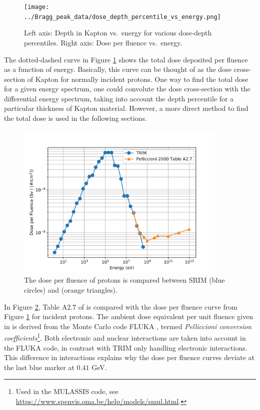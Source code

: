\documentclass{hitec}
\begin{document}
\begin{figure}[htbp!]
	\centering
	\texttt{[image: ../Bragg\_peak\_data/dose\_depth\_percentile\_vs\_energy.png]}
	\caption{Left axis: Depth in Kapton vs.\ energy for various dose-depth percentiles. Right axis: Dose per fluence vs.\ energy.}\label{fig:dose_depth_percentile_vs_energy}
\end{figure}


The dotted-dashed curve in Figure \ref{fig:dose_depth_percentile_vs_energy} shows the total dose deposited per fluence as a function of energy. Basically, this curve can be thought of as the dose cross-section of Kapton for normally incident protons. One way to find the total dose for a given energy spectrum, one could convolute the dose cross-section with the differential energy spectrum, taking into account the depth percentile for a particular thickness of Kapton material. However, a more direct method to find the total dose is used in the following sections.

\begin{figure}[h!]
	\centering
	\includegraphics[width=0.9\textwidth]{../Bragg_peak_data/comparison_dose_vs_energy.png}
	\caption{The dose per fluence of protons is compared between SRIM (blue circles) and \cite{pelliccioni2000overview} (orange triangles).}\label{fig:comparison_dose_vs_energy}
\end{figure}

In Figure \ref{fig:comparison_dose_vs_energy}, Table A2.7 of \cite{pelliccioni2000overview} is compared with the dose per fluence curve from Figure \ref{fig:dose_depth_percentile_vs_energy} for incident protons. The ambient dose equivalent per unit fluence given in \cite{pelliccioni2000overview} is derived from the Monte Carlo code FLUKA \citep{battistoni2015overview}, termed \textit{Pelliccioni conversion coefficients}\footnote{Used in the MULASSIS code, see \url{https://www.spenvis.oma.be/help/models/smul.html}.}. Both electronic and nuclear interactions are taken into account in the FLUKA code, in contrast with TRIM only handling electronic interactions. This difference in interactions explains why the dose per fluence curves deviate at the last blue marker at $0.41$ GeV.
\end{document}
